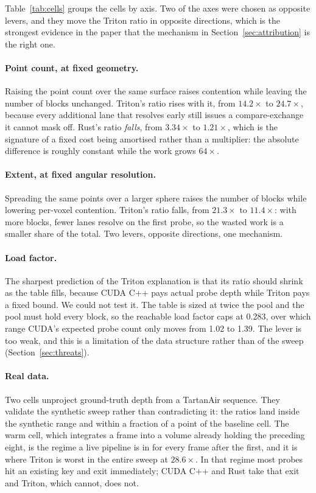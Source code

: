 \documentclass[11pt]{article}
\begin{document}
Table~\ref{tab:cells} groups the cells by axis. Two of the axes were chosen as
opposite levers, and they move the Triton ratio in opposite directions, which is
the strongest evidence in the paper that the mechanism in
Section~\ref{sec:attribution} is the right one.

\paragraph{Point count, at fixed geometry.} Raising the point count over the same
surface raises contention while leaving the number of blocks unchanged. Triton's
ratio rises with it, from $14.2\times$ to $24.7\times$, because every additional
lane that resolves early still issues a compare-exchange it cannot mask off.
Rust's ratio \emph{falls}, from $3.34\times$ to $1.21\times$, which is the
signature of a fixed cost being amortised rather than a multiplier: the absolute
difference is roughly constant while the work grows $64\times$.

\paragraph{Extent, at fixed angular resolution.} Spreading the same points over a
larger sphere raises the number of blocks while lowering per-voxel contention.
Triton's ratio falls, from $21.3\times$ to $11.4\times$: with more blocks, fewer
lanes resolve on the first probe, so the wasted work is a smaller share of the
total. Two levers, opposite directions, one mechanism.

\paragraph{Load factor.} The sharpest prediction of the Triton explanation is
that its ratio should shrink as the table fills, because CUDA C++ pays actual
probe depth while Triton pays a fixed bound. We could not test it. The table is
sized at twice the pool and the pool must hold every block, so the reachable load
factor caps at 0.283, over which range CUDA's expected probe count only moves
from 1.02 to 1.39. The lever is too weak, and this is a limitation of the data
structure rather than of the sweep (Section~\ref{sec:threats}).

\paragraph{Real data.} Two cells unproject ground-truth depth from a TartanAir
sequence. They validate the synthetic sweep rather than contradicting it: the
ratios land inside the synthetic range and within a fraction of a point of the
baseline cell. The warm cell, which integrates a frame into a volume already
holding the preceding eight, is the regime a live pipeline is in for every frame
after the first, and it is where Triton is worst in the entire sweep at
$28.6\times$. In that regime most probes hit an existing key and exit
immediately; CUDA C++ and Rust take that exit and Triton, which cannot, does not.
\end{document}
